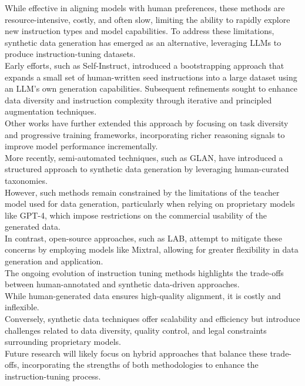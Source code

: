 \documentclass[12pt]{article}
\begin{document}
While effective in aligning models with human preferences, these methods are resource-intensive, costly, and often slow, limiting the ability to rapidly explore new instruction types and model capabilities.
To address these limitations, synthetic data generation has emerged as an alternative, leveraging LLMs to produce instruction-tuning datasets.\vspace{14pt}\\
Early efforts, such as Self-Instruct, introduced a bootstrapping approach that expands a small set of human-written seed instructions into a large dataset using an LLM’s own generation capabilities. Subsequent refinements sought to enhance data diversity and instruction complexity through iterative and principled augmentation techniques.\\
Other works have further extended this approach by focusing on task diversity and progressive training frameworks, incorporating richer reasoning signals to improve model performance incrementally.\vspace{14pt}\\
More recently, semi-automated techniques, such as GLAN, have introduced a structured approach to synthetic data generation by leveraging human-curated taxonomies.\\
However, such methods remain constrained by the limitations of the teacher model used for data generation, particularly when relying on proprietary models like GPT-4, which impose restrictions on the commercial usability of the generated data.\vspace{14pt}\\
In contrast, open-source approaches, such as LAB, attempt to mitigate these concerns by employing models like Mixtral, allowing for greater flexibility in data generation and application.\vspace{14pt}\\
The ongoing evolution of instruction tuning methods highlights the trade-offs between human-annotated and synthetic data-driven approaches.\\
While human-generated data ensures high-quality alignment, it is costly and inflexible.\\
Conversely, synthetic data techniques offer scalability and efficiency but introduce challenges related to data diversity, quality control, and legal constraints surrounding proprietary models.\\
Future research will likely focus on hybrid approaches that balance these trade-offs, incorporating the strengths of both methodologies to enhance the instruction-tuning process.
\end{document}
